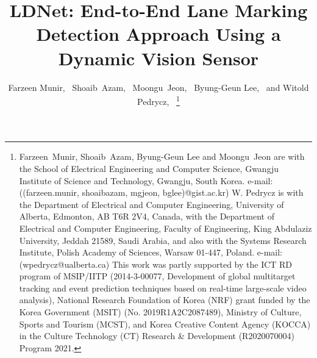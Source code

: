 \documentclass[journal]{IEEEtran}
\begin{document}
\title{LDNet: End-to-End Lane Marking Detection Approach Using a Dynamic Vision Sensor}

\author{Farzeen Munir,~
Shoaib~Azam,~
Moongu~Jeon,~ Byung-Geun Lee,~ and Witold Pedrycz,~ 
\thanks{Farzeen~Munir, Shoaib~Azam, Byung-Geun Lee  and Moongu~Jeon are
with the School of Electrical Engineering and Computer Science,
Gwangju Institute of Science and Technology,
Gwangju, South Korea.
e-mail:((farzeen.munir, shoaibazam, mgjeon, bglee)@gist.ac.kr) 
\newline
W. Pedrycz is with the Department of Electrical and Computer Engineering,
University of Alberta, Edmonton, AB T6R 2V4, Canada, with the Department
of Electrical and Computer Engineering, Faculty of Engineering, King Abdulaziz University, Jeddah 21589, Saudi Arabia, and also with the Systems Research Institute, Polish Academy of Sciences, Warsaw 01-447, Poland. 
\newline
e-mail:(wpedrycz@ualberta.ca)
\newline
This work was partly supported by the ICT RD program of MSIP/IITP (2014-3-00077, Development of global multitarget tracking and event prediction techniques based on real-time large-scale video analysis), National Research Foundation of Korea (NRF) grant funded by the Korea Government (MSIT) (No. 2019R1A2C2087489), Ministry of Culture, Sports and Tourism (MCST), and Korea Creative Content Agency (KOCCA) in the Culture Technology (CT) Research \& Development (R2020070004) Program 2021.}}

\maketitle
\end{document}
